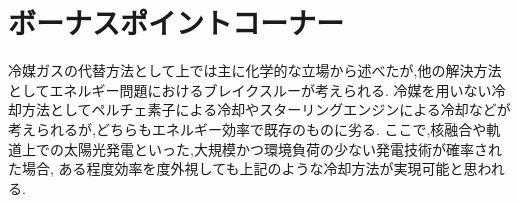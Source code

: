 \section{ボーナスポイントコーナー}
冷媒ガスの代替方法として上では主に化学的な立場から述べたが,他の解決方法としてエネルギー問題におけるブレイクスルーが考えられる.
冷媒を用いない冷却方法としてペルチェ素子による冷却やスターリングエンジンによる冷却などが考えられるが,どちらもエネルギー効率で既存のものに劣る.
ここで,核融合や軌道上での太陽光発電といった,大規模かつ環境負荷の少ない発電技術が確率された場合,
ある程度効率を度外視しても上記のような冷却方法が実現可能と思われる.